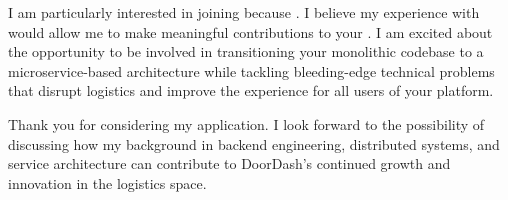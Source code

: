 I am particularly interested in joining \COMPANY{} because \SPECIFICREASON. I believe my experience with \RELEVANTTECHNOLOGY{} would allow me to make meaningful contributions to your \TEAMNAME. I am excited about the opportunity to be involved in transitioning your monolithic codebase to a microservice-based architecture while tackling bleeding-edge technical problems that disrupt logistics and improve the experience for all users of your platform.

Thank you for considering my application. I look forward to the possibility of discussing how my background in backend engineering, distributed systems, and service architecture can contribute to DoorDash's continued growth and innovation in the logistics space.